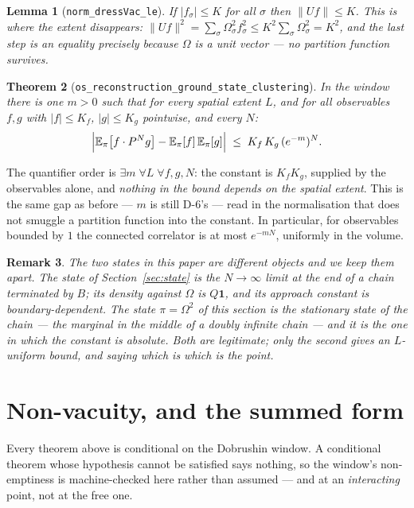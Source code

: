 \documentclass[11pt]{article}
\newtheorem{theorem}{Theorem}[section]
\newtheorem{lemma}[theorem]{Lemma}
\newtheorem{remark}[theorem]{Remark}
\newcommand{\lean}[1]{\texttt{#1}}
\begin{document}
\begin{lemma}[\lean{norm\_dressVac\_le}]
If $\lvert f_\sigma\rvert \le K$ for all $\sigma$ then
$\lVert Uf\rVert \le K$.  \emph{This is where the extent
disappears}: $\lVert Uf\rVert^2 = \sum_\sigma \Omega_\sigma^2
f_\sigma^2 \le K^2\sum_\sigma \Omega_\sigma^2 = K^2$, and the last
step is an equality precisely because $\Omega$ is a unit vector --- no
partition function survives.
\end{lemma}

\begin{theorem}[\lean{os\_reconstruction\_ground\_state\_clustering}]
In the window there is \emph{one} $m>0$ such that for \emph{every}
spatial extent $L$, and for all observables $f,g$ with
$\lvert f\rvert \le K_f$, $\lvert g\rvert\le K_g$ pointwise, and every
$N$:
\[
\Bigl| \mathbb{E}_\pi\bigl[f\cdot P^N g\bigr]
  - \mathbb{E}_\pi[f]\,\mathbb{E}_\pi[g] \Bigr|
\;\le\; K_f\,K_g\,(e^{-m})^N .
\]
\end{theorem}

The quantifier order is $\exists m\;\forall L\;\forall f,g,N$: the
constant is $K_fK_g$, supplied by the observables alone, and
\emph{nothing in the bound depends on the spatial extent}.  This is the
same gap as before --- $m$ is still D-6's --- read in the normalisation
that does not smuggle a partition function into the constant.  In
particular, for observables bounded by $1$ the connected correlator is
at most $e^{-mN}$, uniformly in the volume.

\begin{remark}\label{rem:twostates}
The two states in this paper are different objects and we keep them
apart.  The state of Section~\ref{sec:state} is the $N\to\infty$ limit
at the \emph{end} of a chain terminated by $B$; its density against
$\Omega$ is $Q\mathbf 1$, and its approach constant is
boundary-dependent.  The state $\pi = \Omega^2$ of this section is the
stationary state of the chain --- the marginal in the \emph{middle} of
a doubly infinite chain --- and it is the one in which the constant is
absolute.  Both are legitimate; only the second gives an $L$-uniform
bound, and saying which is which is the point.
\end{remark}

\section{Non-vacuity, and the summed form}\label{sec:nonvacuity}
Every theorem above is conditional on the Dobrushin window.  A conditional
theorem whose hypothesis cannot be satisfied says nothing, so the window's
non-emptiness is machine-checked here rather than assumed --- and at an
\emph{interacting} point, not at the free one.
\end{document}
